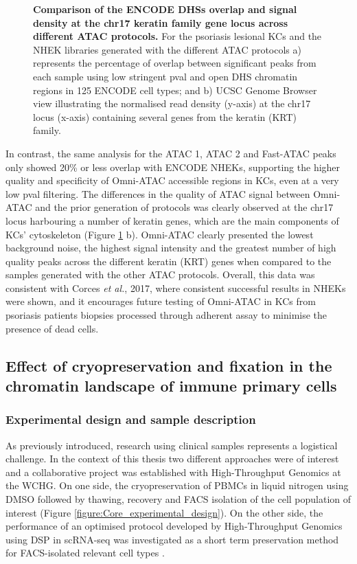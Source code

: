 \begin{figure}[htbp]
\begin{subfigure}{0.5\textwidth}
\caption{\textbf{}}
\end{subfigure}
\caption[Comparison of the ENCODE DHSs overlap and signal density at the chr17 keratin family gene locus across different ATAC protocols.]{\textbf{Comparison of the ENCODE DHSs overlap and signal density at the chr17 keratin family gene locus across different ATAC protocols.} For the psoriasis lesional KCs and the NHEK libraries generated with the different ATAC protocols a) represents the percentage of overlap between significant peaks from each sample using low stringent pval and open DHS chromatin regions in 125 ENCODE cell types; and  b) UCSC Genome Browser view illustrating the normalised read density (y-axis) at the chr17 locus (x-axis) containing several genes from the keratin (KRT) family.}
\label{figure:ATAC_skin_ENCODE_overlap_and_tracks}
\end{figure} 

In contrast, the same analysis for the ATAC 1, ATAC 2 and Fast-ATAC peaks only showed 20\% or less overlap with ENCODE NHEKs, supporting the higher quality and specificity of Omni-ATAC accessible regions in KCs, even at a very low pval filtering. The differences in the quality of ATAC signal between Omni-ATAC and the prior generation of protocols was clearly observed at the chr17 locus harbouring a number of keratin genes, which are the main components of KCs' cytoskeleton (Figure \ref{figure:ATAC_skin_ENCODE_overlap_and_tracks} b). Omni-ATAC clearly presented the lowest background noise, the highest signal intensity and the greatest number of high quality peaks across the different keratin (KRT) genes when compared to the samples generated with the other ATAC protocols. Overall, this data was consistent with Corces \textit{et al.}, 2017, where consistent successful results in NHEKs were shown, and it encourages future testing of Omni-ATAC in KCs from psoriasis patients biopsies processed through adherent assay to minimise the presence of dead cells.


\subsection{Effect of cryopreservation and fixation in the chromatin landscape of immune primary cells}
\label{Core}
\subsubsection{Experimental design and sample description}
As previously introduced, research using clinical samples represents a logistical challenge. In the context of this thesis two different approaches were of interest and a collaborative project was established with High-Throughput Genomics at the WCHG. On one side, the cryopreservation of PBMCs in liquid nitrogen using DMSO followed by thawing, recovery and FACS isolation of the cell population of interest (Figure \ref{figure:Core_experimental_design}). On the other side, the performance of an optimised protocol developed by High-Throughput Genomics using DSP in scRNA-seq \parencite{Attar2018} was investigated as a short term preservation method for FACS-isolated relevant cell types .

